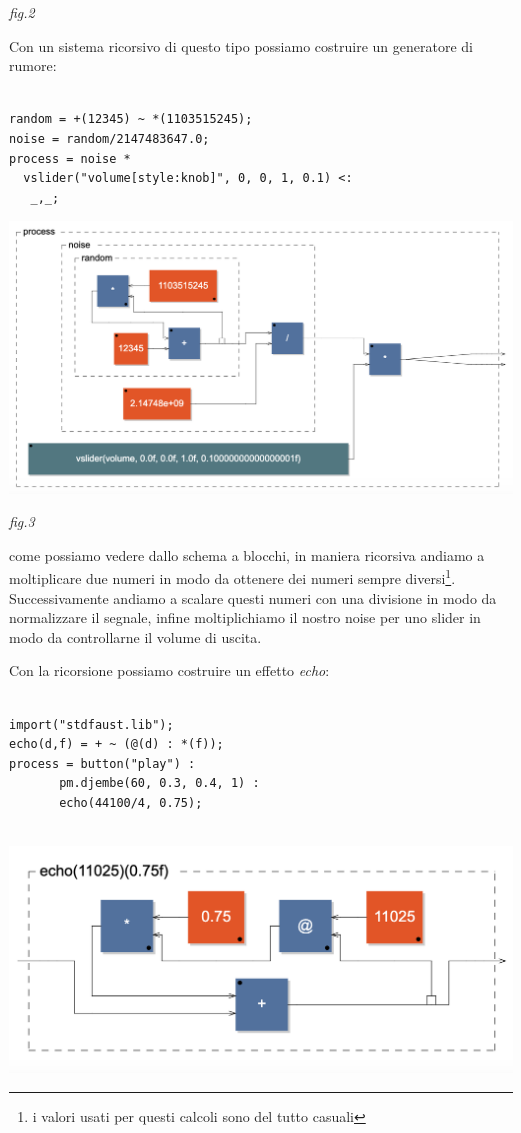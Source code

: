 \documentclass[11pt]{article}
\begin{document}
\begin{multicols*}{2}
\begin{center}
{\scriptsize \emph{fig.2 }}
\end{center}

\noindent Con un sistema ricorsivo di questo tipo possiamo costruire un generatore di rumore:

\begin{Verbatim}[fontsize=\scriptsize]

random = +(12345) ~ *(1103515245);
noise = random/2147483647.0;
process = noise * 
  vslider("volume[style:knob]", 0, 0, 1, 0.1) <:
   _,_;
\end{Verbatim}

\begin{center}
\includegraphics[scale=0.3]{img/03.png}

{\scriptsize \emph{fig.3 }}
\end{center}

\noindent come possiamo vedere dallo schema a blocchi, in maniera ricorsiva andiamo a moltiplicare due numeri in modo da ottenere dei numeri sempre diversi\footnote{i valori usati per questi calcoli sono del tutto casuali}. Successivamente andiamo a scalare questi numeri con una divisione in modo da normalizzare il segnale, infine moltiplichiamo il nostro noise per uno slider in modo da controllarne il volume di uscita.

Con la ricorsione possiamo costruire un effetto \textit{echo}:

\begin{Verbatim}[fontsize=\scriptsize]

import("stdfaust.lib");
echo(d,f) = + ~ (@(d) : *(f));
process = button("play") : 
       pm.djembe(60, 0.3, 0.4, 1) : 
       echo(44100/4, 0.75);
    
\end{Verbatim}

\begin{center}
\includegraphics[scale=0.3]{img/04.png}


\end{center}
\end{multicols*}
\end{document}
